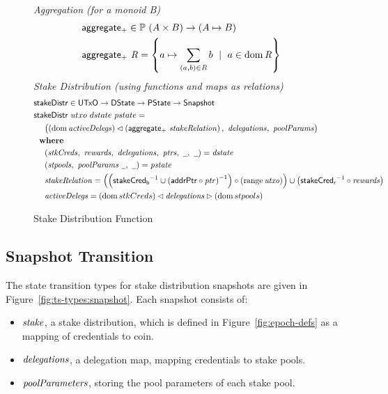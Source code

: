 \begin{figure}[htb]
  \emph{Aggregation (for a monoid B)}
  \begin{align*}
      & \mathsf{aggregate_{+}} \in \mathbb{P}~(A \times B) \to (A\mapsto B) \\
      & \mathsf{aggregate_{+}}~\mathit{R} = \left\{a\mapsto \sum_{(a,b)\in\mathit{R}}b
          ~\mid~a\in\operatorname{dom}\mathit{R}\right\} \\
  \end{align*}
  \emph{Stake Distribution (using functions and maps as relations)}
  \begin{align*}
      & \fun{stakeDistr} \in \UTxO \to \DState \to \PState \to \Snapshot \\
      & \fun{stakeDistr}~{utxo}~{dstate}~{pstate} = \\
      & ~~~~ \big((\dom{\var{activeDelegs}})
      \restrictdom\left(\fun{aggregate_{+}}~\var{stakeRelation}\right),
    ~\var{delegations},~\var{poolParams}\big)\\
      & \where \\
      & ~~~~ (\var{stkCreds},~\var{rewards},~\var{delegations},~\var{ptrs},~\wcard,~\wcard)
        = \var{dstate} \\
      & ~~~~ (\var{stpools},~\var{poolParams}~\wcard,~\wcard) = \var{pstate} \\
      & ~~~~ \var{stakeRelation} = \left(
        \left(\fun{stakeCred_b}^{-1}\cup\left(\fun{addrPtr}\circ\var{ptr}\right)^{-1}\right)
        \circ\left(\range{\var{utxo}}\right)
        \right)
        \cup \left(\fun{stakeCred_r}^{-1}\circ\var{rewards}\right) \\
      & ~~~~ \var{activeDelegs} =
               (\dom{stkCreds}) \restrictdom \var{delegations} \restrictrange (\dom{stpools}) \\
  \end{align*}

  \caption{Stake Distribution Function}
  \label{fig:functions:stake-distribution}
\end{figure}

\clearpage

\subsection{Snapshot Transition}
\label{sec:snapshots}

The state transition types for stake distribution snapshots are given in
Figure~\ref{fig:ts-types:snapshot}.
Each snapshot consists of:
\begin{itemize}
  \item $\mathit{stake}$, a stake distribution, which is defined in
    Figure~\ref{fig:epoch-defs} as a mapping of credentials to coin.
  \item $\mathit{delegations}$, a delegation map, mapping credentials to stake pools.
  \item $\mathit{poolParameters}$, storing the pool parameters of each stake pool.
\end{itemize}

